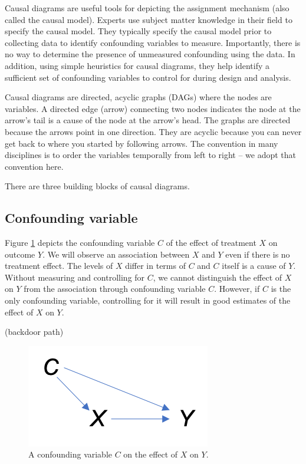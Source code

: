 \documentclass[]{book}
\begin{document}
Causal diagrams are useful tools for depicting the assignment mechanism (also called the causal model). Experts use subject matter knowledge in their field to specify the causal model. They typically specify the causal model prior to collecting data to identify confounding variables to measure. Importantly, there is no way to determine the presence of unmeasured confounding using the data. In addition, using simple heuristics for causal diagrams, they help identify a sufficient set of confounding variables to control for during design and analysis.

Causal diagrams are directed, acyclic graphs (DAGs) where the nodes are variables. A directed edge (arrow) connecting two nodes indicates the node at the arrow's tail is a cause of the node at the arrow's head. The graphs are directed because the arrows point in one direction. They are acyclic because you can never get back to where you started by following arrows. The convention in many disciplines is to order the variables temporally from left to right -- we adopt that convention here.

There are three building blocks of causal diagrams.

\hypertarget{confounding-variable}{%
\subsection{Confounding variable}\label{confounding-variable}}

Figure \ref{fig:confounder} depicts the confounding variable \(C\) of the effect of treatment \(X\) on outcome \(Y\). We will observe an association between \(X\) and \(Y\) even if there is no treatment effect. The levels of \(X\) differ in terms of \(C\) and \(C\) itself is a cause of \(Y\). Without measuring and controlling for \(C\), we cannot distinguish the effect of \(X\) on \(Y\) from the association through confounding variable \(C\). However, if \(C\) is the only confounding variable, controlling for it will result in good estimates of the effect of \(X\) on \(Y\).

(backdoor path)

\begin{figure}
\centering
\includegraphics{./images/confounder.png}
\caption{\label{fig:confounder} A confounding variable \(C\) on the effect of \(X\) on \(Y\).}
\end{figure}
\end{document}
